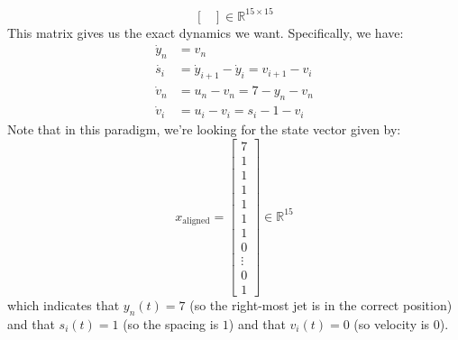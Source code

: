 \documentclass[12pt]{exam}
\begin{document}
\begin{questions}
\begin{solution}
\begin{enumerate}[label=(\alph*)]
\begin{itemize}
\[\begin{bmatrix}
              \end{bmatrix} \in \mathbb{R}^{15 \times 15}
          \]
          This matrix gives us the exact dynamics we want. Specifically, we have:
          \begin{align*}
            \dot{y}_n &= v_n \\
            \dot{s_i} &= \dot{y}_{i+1} - \dot{y}_i = v_{i+1} - v_i \\
            \dot{v}_n &= u_n - v_n = 7 - y_n - v_n \\
            \dot{v}_i &= u_i - v_i = s_i - 1 - v_i
          \end{align*}
          Note that in this paradigm, we're looking for the state vector given by:
          \[
            x_{\text{aligned}} =
              \begin{bmatrix}
                7 \\
                1 \\
                1 \\
                1 \\
                1 \\
                1 \\
                1 \\
                0 \\
                \vdots  \\
                0 \\
                1
              \end{bmatrix} \in \mathbb{R}^{15}
          \]
          which indicates that $y_n(t) = 7$ (so the right-most jet is in the correct position) and that $s_i(t) = 1$ (so the spacing is $1$) and that $v_i(t) = 0$ (so velocity is $0$).


\end{itemize}
\end{enumerate}
\end{solution}
\end{questions}
\end{document}
